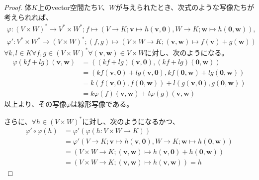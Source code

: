 \documentclass[dvipdfmx]{jsarticle}
\begin{document}
\begin{proof}
体$K$上のvector空間たち$V$、$W$が与えられたとき、次式のような写像たちが考えられれば、
\begin{align*}
\varphi:(V \times W)^{*} \rightarrow V^{*} \times W^{*};f \mapsto \left( V \rightarrow K;\mathbf{v} \mapsto h\left( \mathbf{v},\mathbf{0} \right),W \rightarrow K;\mathbf{w} \mapsto h\left( \mathbf{0},\mathbf{w} \right) \right),\\
\varphi':V^{*} \times W^{*} \rightarrow (V \times W)^{*};(f,g) \mapsto \left( V \times W \rightarrow K;\left( \mathbf{v},\mathbf{w} \right) \mapsto f\left( \mathbf{v} \right) + g\left( \mathbf{w} \right) \right)
\end{align*}
$\forall k,l \in K\forall f,g \in (V \times W)^{*}\forall\left( \mathbf{v},\mathbf{w} \right) \in V \times W$に対し、次のようになる。
\begin{align*}
\varphi(kf + lg)\left( \mathbf{v},\mathbf{w} \right) &= \left( (kf + lg)\left( \mathbf{v},\mathbf{0} \right),(kf + lg)\left( \mathbf{0},\mathbf{w} \right) \right)\\
&= \left( kf\left( \mathbf{v},\mathbf{0} \right) + lg\left( \mathbf{v},\mathbf{0} \right),kf\left( \mathbf{0},\mathbf{w} \right) + lg\left( \mathbf{0},\mathbf{w} \right) \right)\\
&= k\left( f\left( \mathbf{v},\mathbf{0} \right),f\left( \mathbf{0},\mathbf{w} \right) \right) + l\left( g\left( \mathbf{v},\mathbf{0} \right),g\left( \mathbf{0},\mathbf{w} \right) \right)\\
&= k\varphi(f)\left( \mathbf{v},\mathbf{w} \right) + l\varphi(g)\left( \mathbf{v},\mathbf{w} \right)
\end{align*}
以上より、その写像$\varphi$は線形写像である。\par
さらに、$\forall h \in (V \times W)^{*}$に対し、次のようになるかつ、
\begin{align*}
\varphi' \circ \varphi(h) &= \varphi'\left( \varphi(h:V \times W \rightarrow K) \right)\\
&= \varphi'\left( V \rightarrow K;\mathbf{v} \mapsto h\left( \mathbf{v},\mathbf{0} \right),W \rightarrow K;\mathbf{w} \mapsto h\left( \mathbf{0},\mathbf{w} \right) \right)\\
&= \left( V \times W \rightarrow K;\left( \mathbf{v},\mathbf{w} \right) \mapsto h\left( \mathbf{v},\mathbf{0} \right) + h\left( \mathbf{0},\mathbf{w} \right) \right)\\
&= \left( V \times W \rightarrow K;\left( \mathbf{v},\mathbf{w} \right) \mapsto h\left( \mathbf{v},\mathbf{w} \right) \right) = h

\end{align*}
\end{proof}
\end{document}
